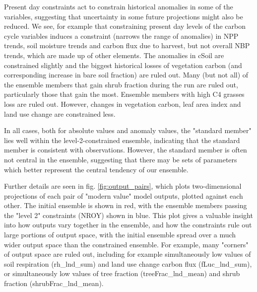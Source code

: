 \documentclass[gmd, manuscript]{copernicus}
\begin{document}
Present day constraints act to constrain historical anomalies in some of the variables, suggesting that uncertainty in some future projections might also be reduced. We see, for example that constraining present day levels of the carbon cycle variables induces a constraint (narrows the range of anomalies) in NPP trends, soil moisture trends and carbon flux due to harvest, but not overall NBP trends, which are made up of other elements. The anomalies in cSoil are constrained slightly and the biggest historical losses of vegetation carbon (and corresponding increase in bare soil fraction) are ruled out. Many (but not all) of the ensemble members that gain shrub fraction during the run are ruled out, particularly those that gain the most. Ensemble members with high C4 grasses loss are ruled out. However, changes in vegetation carbon, leaf area index and land use change are constrained less.

In all cases, both for absolute values and anomaly values, the "standard member" lies well within the level-2-constrained ensemble, indicating that the standard member is consistent with observations. However, the standard member is often not central in the ensemble, suggesting that there may be sets of parameters which better represent the central tendency of our ensemble.

Further details are seen in fig. \ref{fig:output_pairs}, which plots two-dimensional projections of each pair of "modern value" model outputs, plotted against each other. The initial ensemble is shown in red, with the ensemble members passing the "level 2" constraints (NROY) shown in blue. This plot gives a valuable insight into how outputs vary together in the ensemble, and how the constraints rule out large portions of output space, with the initial ensemble spread over a much wider output space than the constrained ensemble. For example, many "corners" of output space are ruled out, including for example simultaneously low values of soil respiration (rh\_lnd\_sum) and land use change carbon flux (fLuc\_lnd\_sum), or simultaneously low values of tree fraction (treeFrac\_lnd\_mean) and shrub fraction (shrubFrac\_lnd\_mean).
\end{document}
